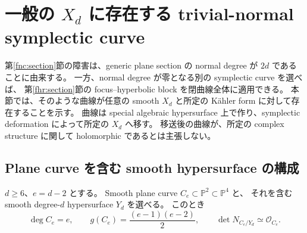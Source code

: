 \section{一般の $X_d$ に存在する trivial-normal symplectic curve}
\label{tnc:section}

第\ref{fnc:section}節の障害は、generic plane section の normal degree が $2d$ であることに由来する。
一方、normal degree が零となる別の symplectic curve を選べば、
第\ref{fhr:section}節の focus--hyperbolic block を閉曲線全体に適用できる。
本節では、そのような曲線が任意の smooth $X_d$ と所定の K\"ahler form に対して存在することを示す。
曲線は special algebraic hypersurface 上で作り、symplectic deformation によって所定の $X_d$ へ移す。
移送後の曲線が、所定の complex structure に関して holomorphic であるとは主張しない。

\subsection{Plane curve を含む smooth hypersurface の構成}

\begin{lemma}\label{tnc:special-member}
$d\ge6$、$e=d-2$ とする。
Smooth plane curve $C_e\subset\mathbb P^2\subset\mathbb P^4$ と、
それを含む smooth degree-$d$ hypersurface $Y_d$ を選べる。
このとき
\begin{equation}\label{tnc:algebraic-data}
 \deg C_e=e,\qquad
 g(C_e)=\frac{(e-1)(e-2)}2,\qquad
 \det N_{C_e/Y_d}\simeq\mathcal O_{C_e}.
\end{equation}
\end{lemma}

